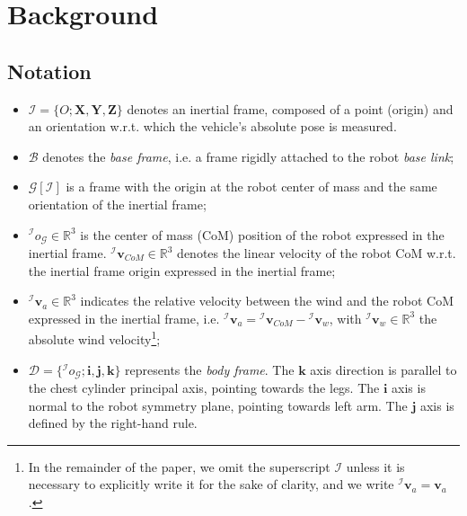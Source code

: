 \section{Background}
\label{background}

\subsection{Notation}
\begin{itemize}
    \item $\mathcal{I}=\{O;\boldsymbol{X},\boldsymbol{Y},\boldsymbol{Z}\}$ denotes an inertial frame, composed of a point (origin) and an orientation w.r.t. which the vehicle’s absolute pose is measured.

    \item $\mathcal{B}$ denotes the \emph{base frame}, i.e. a frame rigidly attached to the robot \emph{base link};
    
    \item $\mathcal{G}[\mathcal{I}]$ is a frame with the origin at the robot center of mass and the same orientation of the inertial frame;
    
    \item ${}^{\mathcal{I}}o_{\mathcal{G}} \in \mathbb{R}^3$ is the center of mass (CoM) position of the robot expressed in the inertial frame. ${}^{\mathcal{I}}\boldsymbol{v}_{CoM} \in \mathbb{R}^3$ denotes the linear velocity of the robot CoM w.r.t. the inertial frame origin expressed in the inertial frame;

    \item ${}^{\mathcal{I}}\boldsymbol{v}_a \in \mathbb{R}^3$ indicates the relative velocity between the wind and the robot CoM expressed in the inertial frame, i.e. ${}^{\mathcal{I}}\boldsymbol{v}_a={}^{\mathcal{I}}\boldsymbol{v}_{CoM}-{}^{\mathcal{I}}\boldsymbol{v}_w$, with ${}^{\mathcal{I}}\boldsymbol{v}_w \in \mathbb{R}^3$ the absolute wind velocity\footnote{In the remainder of the paper, we omit the superscript $\mathcal{I}$ unless it is necessary to explicitly write it for the sake of clarity, and we write ${}^{\mathcal{I}}\boldsymbol{v}_a=\boldsymbol{v}_a$.};
    
    \item $\mathcal{D}=\{{}^{\mathcal{I}}o_{\mathcal{G}};\boldsymbol{i},\boldsymbol{j},\boldsymbol{k}\}$ represents the \emph{body frame}. The $\boldsymbol{k}$ axis direction is parallel to the chest cylinder principal axis, pointing towards the legs. The $\boldsymbol{i}$ axis is normal to the robot symmetry plane, pointing towards left arm. The $\boldsymbol{j}$ axis is defined by the right-hand rule.    
\end{itemize}

